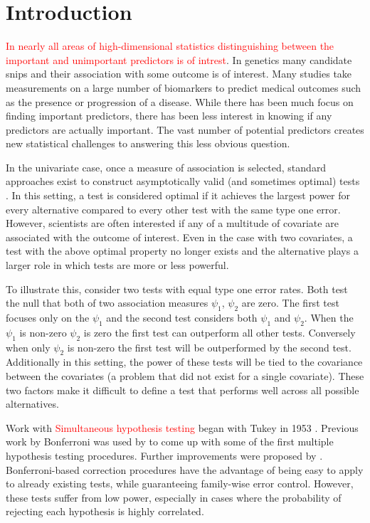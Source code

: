\documentclass{article}
\author{Adam Elder}
\newcommand{\sh}{\textcolor{red}}
\begin{document}
\section{Introduction}

\sh{In nearly all areas of high-dimensional statistics distinguishing between the important and unimportant predictors is of intrest}. In genetics many candidate snips and their association with some outcome is of interest. Many studies take measurements on a large number of biomarkers to predict medical outcomes such as the presence or progression of a disease. While there has been much focus on finding important predictors, there has been less interest in knowing if any predictors are actually important.  The vast number of potential predictors creates new statistical challenges to answering this less obvious question. 

In the univariate case, once a measure of association is selected, standard approaches exist to construct asymptotically valid (and sometimes optimal) tests \citep{neyman_jerzy_ix._1933}. In this setting, a test is considered optimal if it achieves the largest power for every alternative compared to every other test with the same type one error.  However, scientists are often interested if any of a multitude of covariate are associated with the outcome of interest.  Even in the case with two covariates, a test with the above optimal property no longer exists and the alternative plays a larger role in which tests are more or less powerful.

To illustrate this, consider two tests with equal type one error rates. Both test the null that both of two association measures $\psi_1$, $\psi_2$ are zero. The first test focuses only on the $\psi_1$ and the second test considers both $\psi_1$ and $\psi_2$.  When the $\psi_1$ is non-zero $\psi_2$ is zero the first test can outperform all other tests.  Conversely when only $\psi_2$ is non-zero the first test will be outperformed by the second test.  Additionally in this setting, the power of these tests will be tied to the covariance between the covariates (a problem that did not exist for a single covariate).  These two factors make it difficult to define a test that performs well across all possible alternatives.  

Work with \textcolor{red}{Simultaneous hypothesis testing}
began with Tukey in 1953 \citep{miller_simultaneous_1981}.  Previous work by Bonferroni was used by \citep{dunn_estimation_1959,dunn_multiple_1961} to come up with some of the first multiple hypothesis testing procedures.  Further improvements were proposed by \citep{hochberg_sharper_1988,holm_simple_1979,s._holland_improved_1988}.  Bonferroni-based correction procedures have the advantage of being easy to apply to already existing tests, while guaranteeing family-wise error control. However, these tests suffer from low power, especially in cases where the probability of rejecting each hypothesis is highly correlated. 
\end{document}
